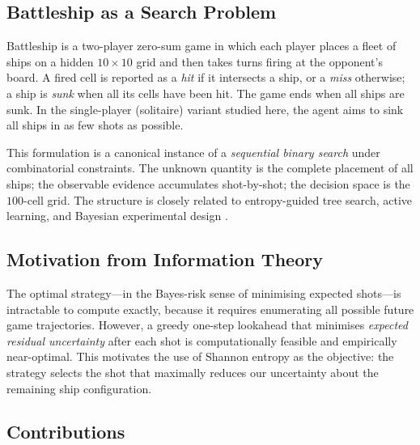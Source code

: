 \documentclass[12pt,a4paper]{article}
\newcommand{\1}{\mathbf{1}}
\begin{document}
\subsection{Battleship as a Search Problem}

Battleship is a two-player zero-sum game in which each player places a fleet of
ships on a hidden $10\times10$ grid and then takes turns firing at the opponent's
board.  A fired cell is reported as a \emph{hit} if it intersects a ship, or a
\emph{miss} otherwise; a ship is \emph{sunk} when all its cells have been hit.
The game ends when all ships are sunk.  In the single-player (solitaire) variant
studied here, the agent aims to sink all ships in as few shots as possible.

This formulation is a canonical instance of a \emph{sequential binary search}
under combinatorial constraints.  The unknown quantity is the complete placement
of all ships; the observable evidence accumulates shot-by-shot; the decision
space is the $100$-cell grid.  The structure is closely related to entropy-guided
tree search, active learning, and Bayesian experimental design
\cite{lindley1956,mackay1992}.

\subsection{Motivation from Information Theory}

The optimal strategy---in the Bayes-risk sense of minimising expected shots---is
intractable to compute exactly, because it requires enumerating all possible
future game trajectories.  However, a greedy one-step lookahead that minimises
\emph{expected residual uncertainty} after each shot is computationally feasible
and empirically near-optimal.  This motivates the use of Shannon entropy
\cite{shannon1948} as the objective: the strategy selects the shot that
maximally reduces our uncertainty about the remaining ship configuration.

\subsection{Contributions}
\end{document}
